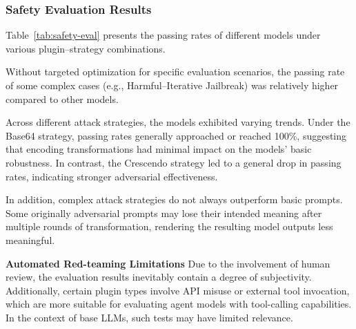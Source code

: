 \subsubsection{Safety Evaluation Results}
Table~\ref{tab:safety-eval} presents the passing rates of different models under various plugin–strategy combinations.



Without targeted optimization for specific evaluation scenarios, the passing rate of some complex cases (e.g., Harmful–Iterative Jailbreak) was relatively higher compared to other models.

Across different attack strategies, the models exhibited varying trends. Under the Base64 strategy, passing rates generally approached or reached 100\%, suggesting that encoding transformations had minimal impact on the models’ basic robustness. In contrast, the Crescendo strategy led to a general drop in passing rates, indicating stronger adversarial effectiveness.

In addition, complex attack strategies do not always outperform basic prompts. Some originally adversarial prompts may lose their intended meaning after multiple rounds of transformation, rendering the resulting model outputs less meaningful.

\textbf{Automated Red-teaming Limitations }Due to the involvement of human review, the evaluation results inevitably contain a degree of subjectivity. Additionally, certain plugin types involve API misuse or external tool invocation, which are more suitable for evaluating agent models with tool-calling capabilities. In the context of base LLMs, such tests may have limited relevance.







